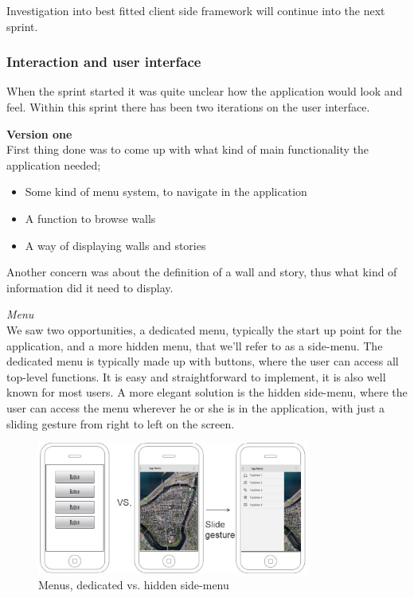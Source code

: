 \documentclass[11pt]{book}
\begin{document}
Investigation into best fitted client side framework will continue into the next sprint.

\subsubsection{Interaction and user interface}
When the sprint started it was quite unclear how the application would look and feel. Within this sprint there has been two iterations on the user interface.

\textbf{Version one}\\
First thing done was to come up with what kind of main functionality the application needed;

\begin{itemize}
    \item Some kind of menu system, to navigate in the application
    \item A function to browse walls
    \item A way of displaying walls and stories
\end{itemize}

Another concern was about the definition of a wall and story, thus what kind of information did it need to display.

\textit{Menu}\\
We saw two opportunities, a dedicated menu, typically the start up point for the application, and a more hidden menu, that we'll refer to as a side-menu. The dedicated menu is typically made up with buttons, where the user can access all top-level functions. It is easy and straightforward to implement, it is also well known for most users. A more elegant solution is the hidden side-menu, where the user can access the menu wherever he or she is in the application, with just a sliding gesture from right to left on the screen.

\begin{figure}[H]
    \centering
    \includegraphics[width=0.8\textwidth]{Figures/Phases/Sprint1/versiononeSliding.png}
    \caption{Menus, dedicated vs. hidden side-menu}
    \label{fig:phases_sprint1_uiVersionOneMenu}
\end{figure}
\end{document}
